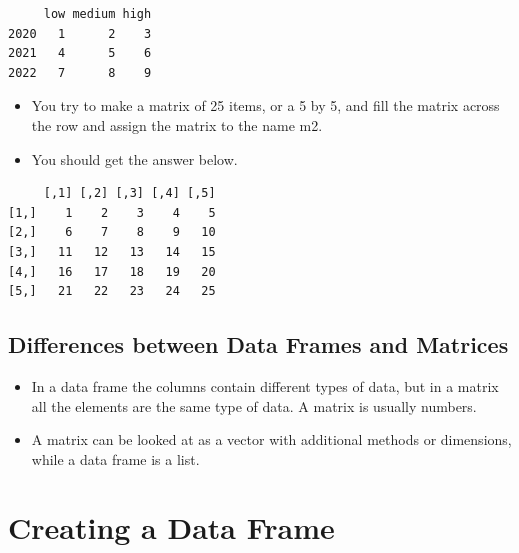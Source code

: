 \documentclass[
  letterpaper,
  DIV=11,
  numbers=noendperiod]{scrreprt}
\providecommand{\tightlist}{%
  \setlength{\itemsep}{0pt}\setlength{\parskip}{0pt}}\usepackage{longtable,booktabs,array}
\begin{document}
\begin{verbatim}
     low medium high
2020   1      2    3
2021   4      5    6
2022   7      8    9
\end{verbatim}

\begin{itemize}
\tightlist
\item
  You try to make a matrix of 25 items, or a 5 by 5, and fill the matrix
  across the row and assign the matrix to the name m2.
\item
  You should get the answer below.
\end{itemize}

\begin{verbatim}
     [,1] [,2] [,3] [,4] [,5]
[1,]    1    2    3    4    5
[2,]    6    7    8    9   10
[3,]   11   12   13   14   15
[4,]   16   17   18   19   20
[5,]   21   22   23   24   25
\end{verbatim}

\subsection{Differences between Data Frames and
Matrices}\label{differences-between-data-frames-and-matrices}

\begin{itemize}
\tightlist
\item
  In a data frame the columns contain different types of data, but in a
  matrix all the elements are the same type of data. A matrix is usually
  numbers.
\item
  A matrix can be looked at as a vector with additional methods or
  dimensions, while a data frame is a list.
\end{itemize}

\section{Creating a Data Frame}\label{creating-a-data-frame}
\end{document}
